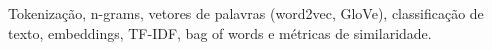 
Tokenização, n-grams, vetores de palavras (word2vec, GloVe), classificação de texto, embeddings, TF-IDF, bag of words e métricas de similaridade.

